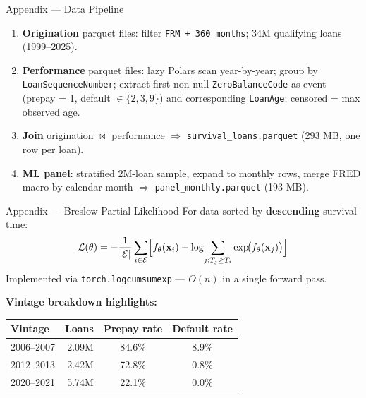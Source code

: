 \documentclass[aspectratio=169]{beamer}
\begin{document}
\appendix

\begin{frame}{Appendix — Data Pipeline}
  \small
  \begin{enumerate}
    \item \textbf{Origination} parquet files: filter \texttt{FRM + 360 months};
      34M qualifying loans (1999–2025).
    \item \textbf{Performance} parquet files: lazy Polars scan year-by-year;
      group by \texttt{LoanSequenceNumber}; extract first non-null
      \texttt{ZeroBalanceCode} as event (prepay = 1, default $\in\{2,3,9\}$)
      and corresponding \texttt{LoanAge}; censored = max observed age.
    \item \textbf{Join} origination $\bowtie$ performance $\Rightarrow$
      \texttt{survival\_loans.parquet} (293 MB, one row per loan).
    \item \textbf{ML panel}: stratified 2M-loan sample, expand to monthly
      rows, merge FRED macro by calendar month $\Rightarrow$
      \texttt{panel\_monthly.parquet} (193 MB).
  \end{enumerate}
\end{frame}

\begin{frame}{Appendix — Breslow Partial Likelihood}
  For data sorted by \textbf{descending} survival time:
  \[
    \mathcal{L}(\theta) = -\frac{1}{|\mathcal{E}|}
    \sum_{i \in \mathcal{E}}
    \Bigl[
      f_\theta(\mathbf{x}_i)
      - \log\!\sum_{j : T_j \geq T_i} \exp\!\bigl(f_\theta(\mathbf{x}_j)\bigr)
    \Bigr]
  \]
  Implemented via \texttt{torch.logcumsumexp} — $O(n)$ in a single forward pass.
  \vspace{0.5em}

  \textbf{Vintage breakdown highlights:}
  \begin{table}
    \small
    \begin{tabular}{lrcc}
      \toprule
      Vintage & Loans & Prepay rate & Default rate \\
      \midrule
      2006–2007 & 2.09M & 84.6\% & 8.9\% \\
      2012–2013 & 2.42M & 72.8\% & 0.8\% \\
      2020–2021 & 5.74M & 22.1\% & 0.0\% \\
      \bottomrule
    \end{tabular}
  \end{table}
\end{frame}
\end{document}
